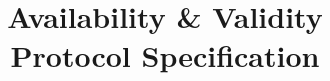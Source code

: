 \documentclass{book}
\begin{document}
\title{
  {\Huge Availability \& Validity}\\
  {\Large Protocol Specification}
}

\date{}

\maketitle

{\tableofcontents}
\newpage







\begin{appendix}
\end{appendix}
\end{document}
